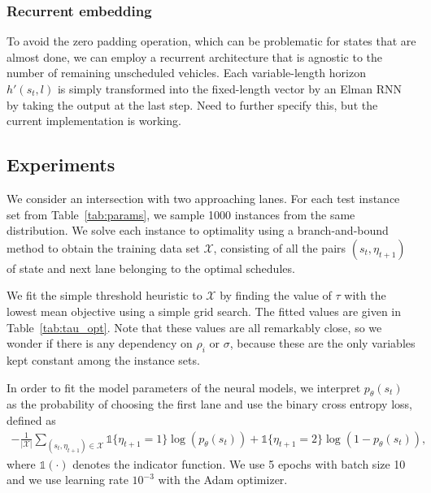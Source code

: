 \documentclass[a4paper]{article}
\theoremstyle{definition}
\theoremstyle{plain}
\begin{document}
\subsubsection*{Recurrent embedding}

To avoid the zero padding operation, which can be problematic for states that
are almost done, we can employ a recurrent architecture that is agnostic to the
number of remaining unscheduled vehicles. Each variable-length horizon
$h'(s_{t}, l)$ is simply transformed into the fixed-length vector by an Elman
RNN by taking the output at the last step. {\color{blue} Need to further specify
  this, but the current implementation is working.}


\subsection*{Experiments}

We consider an intersection with two approaching lanes. For each test instance
set from Table~\ref{tab:params}, we sample 1000 instances from the same
distribution. We solve each instance to optimality using a branch-and-bound
method to obtain the training data set $\mathcal{X}$, consisting of all the
pairs $(s_{t}, \eta_{t+1})$ of state and next lane belonging to the optimal
schedules.

We fit the simple threshold heuristic to $\mathcal{X}$ by finding the value of
$\tau$ with the lowest mean objective using a simple grid search. The fitted values
are given in Table~\ref{tab:tau_opt}. Note that these values are all remarkably
close, so we wonder if there is any dependency on $\rho_{i}$ or $\sigma$,
because these are the only variables kept constant among the instance sets.


In order to fit the model parameters of the neural models, we interpret
$p_{\theta}(s_{t})$ as the probability of choosing the first lane and use the
binary cross entropy loss, defined as
\begin{align*}
  - \frac{1}{|\mathcal{X}|} \sum_{(s_{t}, \eta_{t+1}) \in \mathcal{X}} \mathds{1}\{\eta_{t+1} = 1\} \log(p_{\theta}(s_{t})) + \mathds{1}\{\eta_{t+1} = 2\} \log(1 - p_{\theta}(s_{t})) ,
\end{align*}
where $\mathds{1}(\cdot)$ denotes the indicator function.
%
We use 5 epochs with batch size 10 and we use learning rate $10^{-3}$ with the
Adam optimizer.
\end{document}
